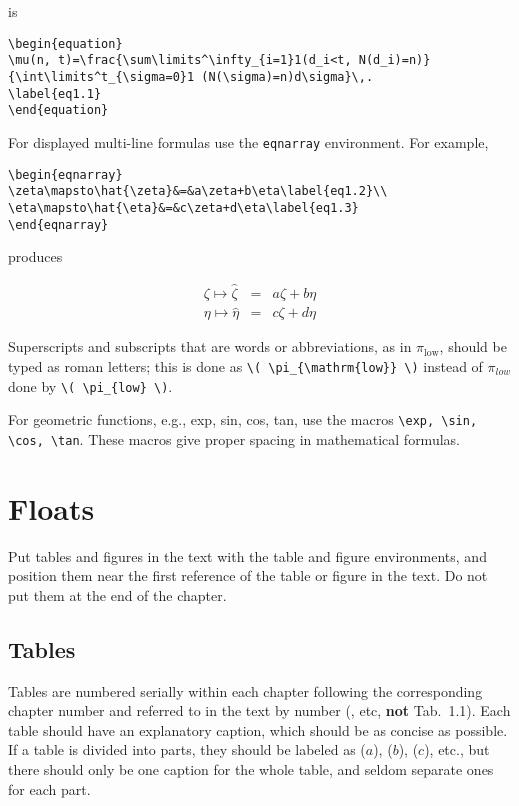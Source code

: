 \noindent is

\begin{verbatim}
\begin{equation}
\mu(n, t)=\frac{\sum\limits^\infty_{i=1}1(d_i<t, N(d_i)=n)}
{\int\limits^t_{\sigma=0}1 (N(\sigma)=n)d\sigma}\,.
\label{eq1.1}
\end{equation}
\end{verbatim}

For displayed multi-line formulas use the \verb|eqnarray| environment. For
example,

\begin{verbatim}
\begin{eqnarray}
\zeta\mapsto\hat{\zeta}&=&a\zeta+b\eta\label{eq1.2}\\
\eta\mapsto\hat{\eta}&=&c\zeta+d\eta\label{eq1.3}
\end{eqnarray}
\end{verbatim}

\noindent produces

\noindent\begin{eqnarray}
\zeta\mapsto\hat{\zeta}&=&a\zeta+b\eta\label{eq1.2}\\
\eta\mapsto\hat{\eta}&=&c\zeta+d\eta\label{eq1.3}
\end{eqnarray}

Superscripts and subscripts that are words or abbreviations, as in
\( \pi_{\mathrm{low}} \), should be typed as roman letters; this is
done as \verb|\( \pi_{\mathrm{low}} \)| instead of \( \pi_{low} \)
done by \verb|\( \pi_{low} \)|.

For geometric functions, e.g., exp, sin, cos, tan, use
the macros \verb|\exp, \sin, \cos, \tan|. These macros give proper
spacing in mathematical formulas.

\section{Floats}
Put tables and figures in the text with the table and figure
environments, and position them near the first reference of the
table or figure in the text. Do not put them at the end of the
chapter.

\subsection{Tables}
Tables are numbered serially within each chapter following the
corresponding chapter number and referred to in the text by number
(, etc, {\bf not} Tab.~1.1). Each table should
have an explanatory caption, which should be as concise as possible.
If a table is divided into parts, they should be labeled as ($a$),
($b$), ($c$), etc., but there should only be one caption for the
whole table, and seldom separate ones for each part.

